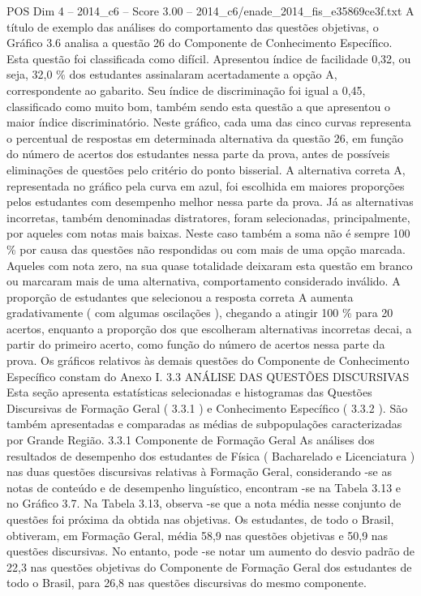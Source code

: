 \begin{textsample}{POS Dim 4 – 2014\_c6 – Score 3.00 – 2014\_c6/enade\_2014\_fis\_e35869ce3f.txt}
A título de exemplo das análises do comportamento das questões objetivas, o Gráfico 3.6 analisa a questão 26 do Componente de Conhecimento Específico.
Esta questão foi classificada como difícil.
Apresentou índice de facilidade 0,32, ou seja, 32,0 \% dos estudantes assinalaram acertadamente a opção A, correspondente ao gabarito.
Seu índice de discriminação foi igual a 0,45, classificado como muito bom, também sendo esta questão a que apresentou o maior índice discriminatório.
Neste gráfico, cada uma das cinco curvas representa o percentual de respostas em determinada alternativa da questão 26, em função do número de acertos dos estudantes nessa parte da prova, antes de possíveis eliminações de questões pelo critério do ponto bisserial.
A alternativa correta A, representada no gráfico pela curva em azul, foi escolhida em maiores proporções pelos estudantes com desempenho melhor nessa parte da prova.
Já as alternativas incorretas, também denominadas distratores, foram selecionadas, principalmente, por aqueles com notas mais baixas.
Neste caso também a soma não é sempre 100 \% por causa das questões não respondidas ou com mais de uma opção marcada.
Aqueles com nota zero, na sua quase totalidade deixaram esta questão em branco ou marcaram mais de uma alternativa, comportamento considerado inválido.
A proporção de estudantes que selecionou a resposta correta A aumenta gradativamente ( com algumas oscilações ), chegando a atingir 100 \% para 20 acertos, enquanto a proporção dos que escolheram alternativas incorretas decai, a partir do primeiro acerto, como função do número de acertos nessa parte da prova.
Os gráficos relativos às demais questões do Componente de Conhecimento Específico constam do Anexo I. 3.3 ANÁLISE DAS QUESTÕES DISCURSIVAS Esta seção apresenta estatísticas selecionadas e histogramas das Questões Discursivas de Formação Geral ( 3.3.1 ) e Conhecimento Específico ( 3.3.2 ).
São também apresentadas e comparadas as médias de subpopulações caracterizadas por Grande Região. 3.3.1 Componente de Formação Geral As análises dos resultados de desempenho dos estudantes de Física ( Bacharelado e Licenciatura ) nas duas questões discursivas relativas à Formação Geral, considerando -se as notas de conteúdo e de desempenho linguístico, encontram -se na Tabela 3.13 e no Gráfico 3.7.
Na Tabela 3.13, observa -se que a nota média nesse conjunto de questões foi próxima da obtida nas objetivas.
Os estudantes, de todo o Brasil, obtiveram, em Formação Geral, média 58,9 nas questões objetivas e 50,9 nas questões discursivas.
No entanto, pode -se notar um aumento do desvio padrão de 22,3 nas questões objetivas do Componente de Formação Geral dos estudantes de todo o Brasil, para 26,8 nas questões discursivas do mesmo componente.

\end{textsample}
